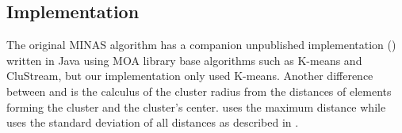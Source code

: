 



\subsection{Implementation}\label{sec:implementation}

The original MINAS algorithm has a companion unpublished implementation ()
written in Java using MOA library base algorithms such as K-means and CluStream,
but our implementation only used K-means.
Another difference between  and \mfog is the calculus of the cluster radius 
from the distances of elements forming the cluster and the cluster's center.
 uses the maximum distance while \mfog uses the standard deviation
of all distances as described in \cite{Faria2015minas}.


